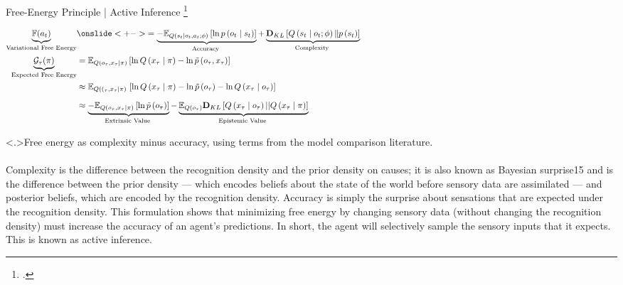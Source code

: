 \documentclass[t,aspectratio=169,xcolor=dvipsnames]{beamer}
\newcommand\blfootcitetext[1]{%
  \begingroup
  \renewcommand\thefootnote{}\footcitetext{#1}%
  \addtocounter{footnote}{-1}%
  \endgroup
}
\begin{document}
{\begin{frame}{Free-Energy Principle | Active Inference}
    \blfootcitetext{friston2010free}
    \begin{align*}
        \underbrace{\mathbb{F}(a_t)}_{\text{Variational Free Energy}} &
        \onslide<+->{=\underbrace{-\mathbb{E}_{Q\left(s_t \mid o_t, a_t ; \phi\right)}\left[\ln p\left(o_t \mid s_t\right)\right]}_{\text {Accuracy }}+\underbrace{\mathbf{D}_{K L}\left[Q\left(s_t \mid o_t ; \phi\right) \| p\left(s_t\right)\right]}_{\text {Complexity }}} \\
        \underbrace{\mathcal{G}_\tau(\pi)}_{\text{Expected Free Energy}} & =\mathbb{E}_{Q\left(o_\tau, x_\tau \mid \pi\right)}\left[\ln Q\left(x_\tau \mid \pi\right)-\ln \tilde{p}\left(o_\tau, x_\tau\right)\right] \\
        & \approx \mathbb{E}_{Q\left(\left(_\tau, x_\tau \mid \pi\right)\right.}\left[\ln Q\left(x_\tau \mid \pi\right)-\ln \tilde{p}\left(o_\tau\right)-\ln Q\left(x_\tau \mid o_\tau\right)\right] \\
        & \approx \underbrace{-\mathbb{E}_{Q\left(o_\tau, x_\tau \mid \pi\right)}\left[\ln \tilde{p}\left(o_\tau\right)\right]}_{\text {Extrinsic Value }}-\underbrace{\mathbb{E}_{Q\left(o_\tau\right)} \mathbf{D}_{K L}\left[Q\left(x_\tau \mid o_\tau\right)|| Q\left(x_\tau \mid \pi\right)\right]}_{\text {Epistemic Value }}
        \phantom{\underbrace{\mathbb{F}(a_t)}_{\text{Variational Free Energy}}} &
        \phantom{=\mathbf{D}_{K L}\left[Q\left(s_t \mid o_t ; \phi\right) \| p\left(o_t, s_t\right)\right]
        =\mathbb{E}_{Q\left(s_t \mid o_t ; \phi\right)}\left[\ln \frac{Q\left(s_t \mid o_t ; \phi\right)}{p\left(o_t, s_t\right)}\right]}
    \end{align*}

    \note<.>{Free energy as complexity minus accuracy, using terms from the model comparison literature.\\~\\
    
    Complexity is the difference between the recognition density and the prior density on causes; it is also known as Bayesian surprise15 and is the difference between the prior density — which encodes beliefs about the state of the world before sensory data are assimilated — and posterior beliefs, which are encoded by the recognition density. Accuracy is simply the surprise about sensations that are expected under the recognition density. This formulation shows that minimizing free energy by changing sensory data (without changing the recognition density) must increase the accuracy of an agent’s predictions. In short, the agent will selectively sample the sensory inputs that it expects. This is known as active inference.}
\end{frame}
    
}
\end{document}
